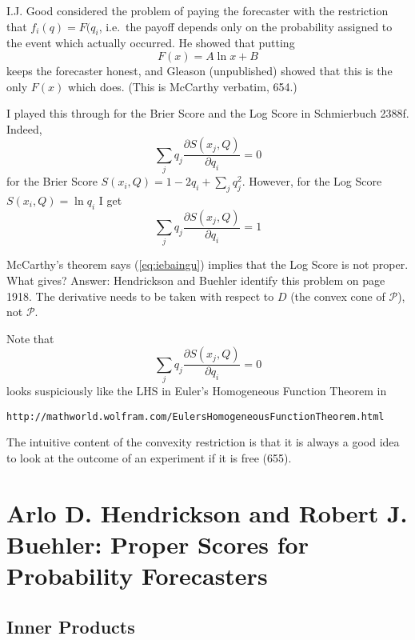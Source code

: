 \documentclass[12pt]{article}
\begin{document}
I.J. Good considered the problem of paying the forecaster with the
restriction that $f_{i}(q)=F(q_{i}$, i.e.\ the payoff depends only on
the probability assigned to the event which actually occurred. He
showed that putting
\begin{equation}
  \label{eq:oquohshu}
  F(x)=A\ln{}x+B
\end{equation}
keeps the forecaster honest, and Gleason (unpublished) showed that
this is the only $F(x)$ which does. (This is McCarthy verbatim, 654.)

I played this through for the Brier Score and the Log Score in
Schmierbuch 2388f. Indeed,
\begin{equation}
  \label{eq:leisooth}
  \sum_{j}q_{j}\frac{\partial{}S(x_{j},Q)}{\partial{}q_{i}}=0
\end{equation}
for the Brier Score $S(x_{i},Q)=1-2q_{i}+\sum_{j}q_{j}^{2}$. However,
for the Log Score $S(x_{i},Q)=\ln{}q_{i}$ I get
\begin{equation}
  \label{eq:iebaingu}
  \sum_{j}q_{j}\frac{\partial{}S(x_{j},Q)}{\partial{}q_{i}}=1
\end{equation}

McCarthy's theorem says (\ref{eq:iebaingu}) implies that the Log Score
is not proper. What gives? Answer: Hendrickson and Buehler identify
this problem on page 1918. The derivative needs to be taken with
respect to $D$ (the convex cone of $\mathcal{P}$), not $\mathcal{P}$.

Note that
\begin{equation}
  \label{eq:eetheaga}
  \sum_{j}q_{j}\frac{\partial{}S(x_{j},Q)}{\partial{}q_{i}}=0
\end{equation}
looks suspiciously like the LHS in Euler's Homogeneous Function
Theorem in
\begin{alltt}
  http://mathworld.wolfram.com/EulersHomogeneousFunctionTheorem.html
\end{alltt}

The intuitive content of the convexity restriction is that it is
always a good idea to look at the outcome of an experiment if it is
free (655). 

\section{Arlo D. Hendrickson and Robert J. Buehler: Proper Scores for
  Probability Forecasters}
\label{section:eibualiu}

\subsection{Inner Products}
\label{subsection:rioxesho}
\end{document}
